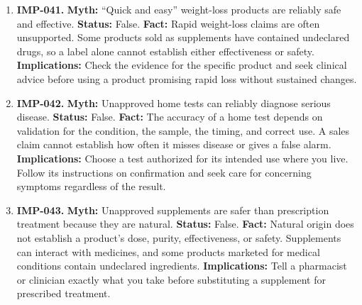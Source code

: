 \documentclass[11pt,oneside]{book}
\begin{document}
\begin{enumerate}[leftmargin=0pt,labelwidth=0pt,labelsep=0pt,itemindent=0pt]
\textbf{Status:} False.\newline
\textbf{Fact:} Small studies have tested mouth taping in selected people, but evidence has not established it as a safe, effective general treatment for snoring or obstructive sleep apnea. Closing the mouth can impede breathing when the nose is obstructed. \cite{ref412,ref283}\newline
\textbf{Implications:} Seek assessment for loud snoring with pauses in breathing, gasping, or daytime sleepiness. Do not substitute mouth tape for prescribed treatment.
\item[] \textbf{IMP-041.} \textbf{Myth:} ``Quick and easy'' weight-loss products are reliably safe and effective.\newline
\textbf{Status:} False.\newline
\textbf{Fact:} Rapid weight-loss claims are often unsupported. Some products sold as supplements have contained undeclared drugs, so a label alone cannot establish either effectiveness or safety. \cite{ref48,ref121}\newline
\textbf{Implications:} Check the evidence for the specific product and seek clinical advice before using a product promising rapid loss without sustained changes.
\item[] \textbf{IMP-042.} \textbf{Myth:} Unapproved home tests can reliably diagnose serious disease.\newline
\textbf{Status:} False.\newline
\textbf{Fact:} The accuracy of a home test depends on validation for the condition, the sample, the timing, and correct use. A sales claim cannot establish how often it misses disease or gives a false alarm. \cite{ref413}\newline
\textbf{Implications:} Choose a test authorized for its intended use where you live. Follow its instructions on confirmation and seek care for concerning symptoms regardless of the result.
\item[] \textbf{IMP-043.} \textbf{Myth:} Unapproved supplements are safer than prescription treatment because they are natural.\newline
\textbf{Status:} False.\newline
\textbf{Fact:} Natural origin does not establish a product's dose, purity, effectiveness, or safety. Supplements can interact with medicines, and some products marketed for medical conditions contain undeclared ingredients. \cite{ref48,ref117}\newline
\textbf{Implications:} Tell a pharmacist or clinician exactly what you take before substituting a supplement for prescribed treatment.

\end{enumerate}
\end{document}
